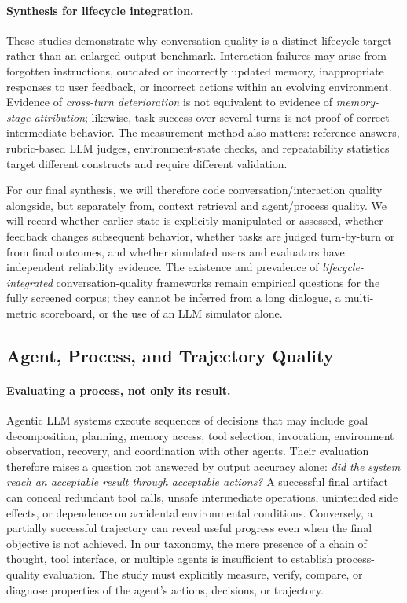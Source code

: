 \paragraph{Synthesis for lifecycle integration.}
These studies demonstrate why conversation quality is a distinct lifecycle target rather than an enlarged output benchmark. Interaction failures may arise from forgotten instructions, outdated or incorrectly updated memory, inappropriate responses to user feedback, or incorrect actions within an evolving environment. Evidence of \emph{cross-turn deterioration} is not equivalent to evidence of \emph{memory-stage attribution}; likewise, task success over several turns is not proof of correct intermediate behavior. The measurement method also matters: reference answers, rubric-based LLM judges, environment-state checks, and repeatability statistics target different constructs and require different validation.

For our final synthesis, we will therefore code conversation/interaction quality alongside, but separately from, context retrieval and agent/process quality. We will record whether earlier state is explicitly manipulated or assessed, whether feedback changes subsequent behavior, whether tasks are judged turn-by-turn or from final outcomes, and whether simulated users and evaluators have independent reliability evidence. The existence and prevalence of \emph{lifecycle-integrated} conversation-quality frameworks remain empirical questions for the fully screened corpus; they cannot be inferred from a long dialogue, a multi-metric scoreboard, or the use of an LLM simulator alone.

\subsection{Agent, Process, and Trajectory Quality}
\label{sec:agent-quality}

\paragraph{Evaluating a process, not only its result.}
Agentic LLM systems execute sequences of decisions that may include goal decomposition, planning, memory access, tool selection, invocation, environment observation, recovery, and coordination with other agents. Their evaluation therefore raises a question not answered by output accuracy alone: \emph{did the system reach an acceptable result through acceptable actions?} A successful final artifact can conceal redundant tool calls, unsafe intermediate operations, unintended side effects, or dependence on accidental environmental conditions. Conversely, a partially successful trajectory can reveal useful progress even when the final objective is not achieved. In our taxonomy, the mere presence of a chain of thought, tool interface, or multiple agents is insufficient to establish process-quality evaluation. The study must explicitly measure, verify, compare, or diagnose properties of the agent's actions, decisions, or trajectory.

